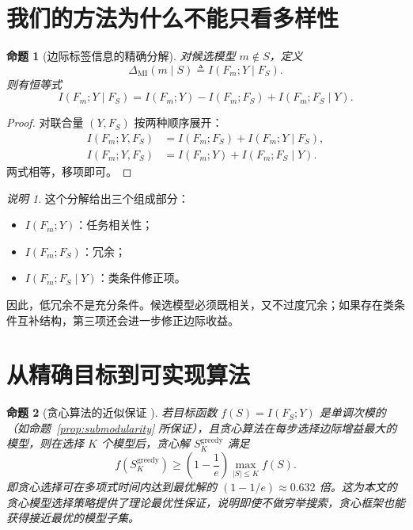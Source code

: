 \documentclass[UTF8,fontset=fandol]{ctexart}
\newtheorem{proposition}{命题}
\theoremstyle{remark}
\newtheorem{remark}{说明}
\begin{document}
\section{我们的方法为什么不能只看多样性}

\begin{proposition}[边际标签信息的精确分解]
对候选模型 $m \notin S$，定义
\[
\Delta_{\mathrm{MI}}(m \mid S) \triangleq I(F_m; Y \mid F_S).
\]
则有恒等式
\[
I(F_m; Y \mid F_S)
= I(F_m; Y) - I(F_m; F_S) + I(F_m; F_S \mid Y).
\]
\end{proposition}

\begin{proof}
对联合量 $(Y, F_S)$ 按两种顺序展开：
\begin{align}
I(F_m; Y, F_S) &= I(F_m; F_S) + I(F_m; Y \mid F_S), \\
I(F_m; Y, F_S) &= I(F_m; Y) + I(F_m; F_S \mid Y).
\end{align}
两式相等，移项即可。
\end{proof}

\begin{remark}
这个分解给出三个组成部分：
\begin{itemize}
    \item $I(F_m; Y)$：任务相关性；
    \item $I(F_m; F_S)$：冗余；
    \item $I(F_m; F_S \mid Y)$：类条件修正项。
\end{itemize}
因此，低冗余不是充分条件。候选模型必须既相关，又不过度冗余；如果存在类条件互补结构，第三项还会进一步修正边际收益。
\end{remark}

\section{从精确目标到可实现算法}

\begin{proposition}[贪心算法的近似保证 \cite{nemhauser1978analysis}]
\label{prop:greedy-guarantee}
若目标函数 $f(S) = I(F_S; Y)$ 是单调次模的（如命题~\ref{prop:submodularity} 所保证），且贪心算法在每步选择边际增益最大的模型，则在选择 $K$ 个模型后，贪心解 $S_K^{\mathrm{greedy}}$ 满足
\[
f(S_K^{\mathrm{greedy}}) \ge \left(1 - \frac{1}{e}\right) \max_{|S| \le K} f(S).
\]
即贪心选择可在多项式时间内达到最优解的 $(1 - 1/e) \approx 0.632$ 倍。这为本文的贪心模型选择策略提供了理论最优性保证，说明即使不做穷举搜索，贪心框架也能获得接近最优的模型子集。
\end{proposition}
\end{document}
